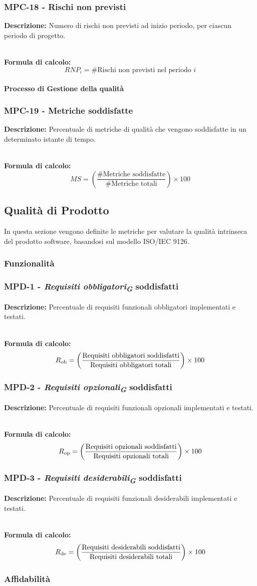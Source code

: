 \documentclass[a4paper,12pt]{article}
\newcommand{\glossario}[1]{\textit{#1}\textsubscript{\textbf{\textit{\textcolor{lightblack}{G}}}}}
\newcommand{\metricdef}[3]{
    \subsubsection*{#1 - #2}
    \textbf{Descrizione:} #3
}
\newcommand{\metricformula}[1]{
    \\[0.5em]
    \textbf{Formula di calcolo:}
    \begin{equation*}
        #1
    \end{equation*}
}
\begin{document}
\metricdef{MPC-18}{Rischi non previsti}
{Numero di rischi non previsti ad inizio periodo, per ciascun periodo di progetto.}
\metricformula{RNP_i = \#\text{Rischi non previsti nel periodo } i}

\paragraph{Processo di Gestione della qualità}

\metricdef{MPC-19}{Metriche soddisfatte}
{Percentuale di metriche di qualità che vengono soddisfatte in un determinato istante di tempo.}
\metricformula{MS = \left( \frac{\#\text{Metriche soddisfatte}}{\#\text{Metriche totali}} \right) \times 100}

\subsection{Qualità di Prodotto} \label{qualita_prodotto}
In questa sezione vengono definite le metriche per valutare la qualità
intrinseca del prodotto software, basandosi sul modello ISO/IEC 9126.

\subsubsection{Funzionalità}

\metricdef{MPD-1}{\glossario{Requisiti obbligatori} soddisfatti}
{Percentuale di requisiti funzionali obbligatori implementati e testati.}
\metricformula{R\textsubscript{ob} = \left( \frac{\text{Requisiti obbligatori soddisfatti}}{\text{Requisiti obbligatori totali}} \right) \times 100}

\metricdef{MPD-2}{\glossario{Requisiti opzionali} soddisfatti}
{Percentuale di requisiti funzionali opzionali implementati e testati.}
\metricformula{R\textsubscript{op} = \left( \frac{\text{Requisiti opzionali soddisfatti}}{\text{Requisiti opzionali totali}} \right) \times 100}

\metricdef{MPD-3}{\glossario{Requisiti desiderabili} soddisfatti}
{Percentuale di requisiti funzionali desiderabili implementati e testati.}
\metricformula{R\textsubscript{de} = \left( \frac{\text{Requisiti desiderabili soddisfatti}}{\text{Requisiti desiderabili totali}} \right) \times 100}

\subsubsection{Affidabilità}
\end{document}
